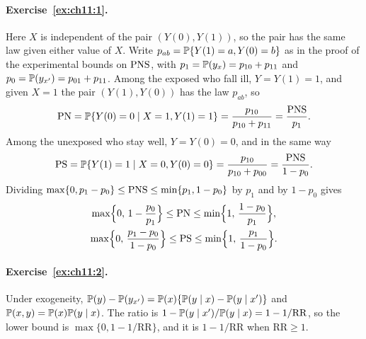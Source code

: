 \paragraph{Exercise~\ref{ex:ch11:1}.} Here $X$ is independent of the pair $(Y(0), Y(1))$, so the pair has the same law given either value of $X$. Write $p_{ab} = \mathbb{P}\{Y(1) = a, Y(0) = b\}$ as in the proof of the experimental bounds on $\mathrm{PNS}$, with $p_1 = \mathbb{P}(y_x) = p_{10} + p_{11}$ and $p_0 = \mathbb{P}(y_{x'}) = p_{01} + p_{11}$. Among the exposed who fall ill, $Y = Y(1) = 1$, and given $X = 1$ the pair $(Y(1), Y(0))$ has the law $p_{ab}$, so
\[
\mathrm{PN} = \mathbb{P}\{Y(0) = 0 \mid X = 1, Y(1) = 1\} = \frac{p_{10}}{p_{10} + p_{11}} = \frac{\mathrm{PNS}}{p_1}.
\]
Among the unexposed who stay well, $Y = Y(0) = 0$, and in the same way
\[
\mathrm{PS} = \mathbb{P}\{Y(1) = 1 \mid X = 0, Y(0) = 0\} = \frac{p_{10}}{p_{10} + p_{00}} = \frac{\mathrm{PNS}}{1 - p_0}.
\]
Dividing $\max\{0, p_1 - p_0\} \leq \mathrm{PNS} \leq \min\{p_1, 1 - p_0\}$ by $p_1$ and by $1 - p_0$ gives
\begin{gather*}
\max\Bigl\{0,\, 1 - \frac{p_0}{p_1}\Bigr\} \leq \mathrm{PN} \leq \min\Bigl\{1,\, \frac{1 - p_0}{p_1}\Bigr\}, \\
\max\Bigl\{0,\, \frac{p_1 - p_0}{1 - p_0}\Bigr\} \leq \mathrm{PS} \leq \min\Bigl\{1,\, \frac{p_1}{1 - p_0}\Bigr\}.
\end{gather*}


\paragraph{Exercise~\ref{ex:ch11:2}.} Under exogeneity, $\mathbb{P}(y) - \mathbb{P}(y_{x'}) = \mathbb{P}(x)\{\mathbb{P}(y \mid x) - \mathbb{P}(y \mid x')\}$ and $\mathbb{P}(x, y) = \mathbb{P}(x)\mathbb{P}(y \mid x)$. The ratio is $1 - \mathbb{P}(y \mid x')/\mathbb{P}(y \mid x) = 1 - 1/\mathrm{RR}$, so the lower bound is $\max\{0, 1 - 1/\mathrm{RR}\}$, and it is $1 - 1/\mathrm{RR}$ when $\mathrm{RR} \geq 1$.

